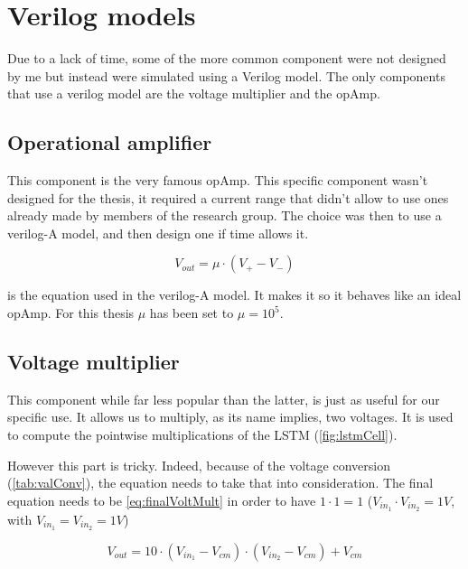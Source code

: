 \section{Verilog models}
\label{sec:models}

Due to a lack of time, some of the more common component were not designed by me but instead were simulated using a Verilog model. The only components that use a verilog model are the voltage multiplier and the \ac{opAmp}.

\subsection{Operational amplifier}\label{subsec:opamp}

This component is the very famous \ac{opAmp}. This specific component wasn't designed for the thesis, it required a current range that didn't allow to use ones already made by members of the research group. The choice was then to use a verilog-A model, and then design one if time allows it.

\begin{equation}
  \label{eq:opAmp}
  V_{out}=\mu \cdot (V_+-V_-)
\end{equation}

 is the equation used in the verilog-A model. It makes it so it behaves like an ideal \ac{opAmp}. For this thesis $\mu$ has been set to $\mu=10^5$.

\subsection{Voltage multiplier}\label{subsec:voltmult}

This component while far less popular than the latter, is just as useful for our specific use. It allows us to multiply, as its name implies, two voltages. It is used to compute the pointwise multiplications of the \ac{LSTM} (\cref{fig:lstmCell}).

However this part is tricky. Indeed, because of the voltage conversion (\cref{tab:valConv}), the equation needs to take that into consideration. The final equation needs to be \cref{eq:finalVoltMult} in order to have $1\cdot 1=1$ ($V_{in_1}\cdot V_{in_2}=1V$, with $V_{in_1}=V_{in_2}=1V$)

\begin{equation}\label{eq:finalVoltMult}
  V_{out}=10\cdot(V_{in_1}-V_{cm})\cdot (V_{in_2}-V_{cm}) + V_{cm}
\end{equation}


